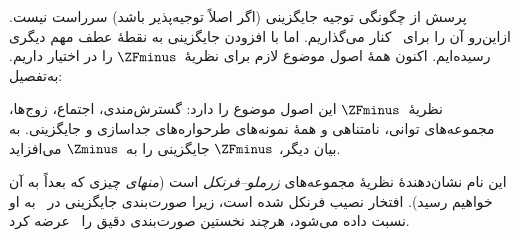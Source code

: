 \documentclass[../../../include/open-logic-section]{subfiles}
\begin{document}

پرسش از چگونگی توجیه جایگزینی (اگر اصلاً توجیه‌پذیر باشد) سرراست نیست.
ازاین‌رو آن را برای~ کنار می‌گذاریم. اما با
افزودن جایگزینی به نقطهٔ عطف مهم دیگری رسیده‌ایم. اکنون همهٔ اصول موضوع
لازم برای نظریهٔ~$\ZFminus$ را در اختیار داریم. به‌تفصیل:

\begin{defn}
نظریهٔ~$\ZFminus$ این اصول موضوع را دارد: گسترش‌مندی، اجتماع، زوج‌ها،
مجموعه‌های توانی، نامتناهی و همهٔ نمونه‌های طرحواره‌های جداسازی و
جایگزینی. به بیان دیگر، $\ZFminus$ جایگزینی را به~$\Zminus$ می‌افزاید.
\end{defn}
\noindent
این نام نشان‌دهندهٔ نظریهٔ مجموعه‌های \emph{زرملو--فرنکل} است
(\emph{منهای} چیزی که بعداً به آن خواهیم رسید). افتخار نصیب فرنکل شده
است، زیرا صورت‌بندی جایگزینی در~\citeyear{Fraenkel1922} به او نسبت داده
می‌شود، هرچند نخستین صورت‌بندی دقیق را~\citet{Skolem1922} عرضه کرد.
\end{document}
